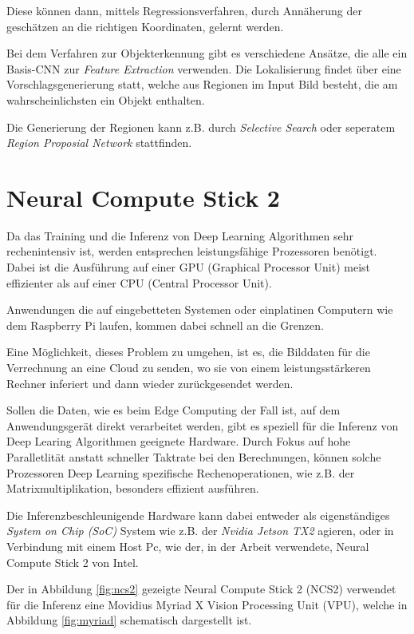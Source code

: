 Diese können dann, mittels Regressionsverfahren, 
durch Annäherung der geschätzen an die richtigen 
Koordinaten, gelernt werden.

Bei dem Verfahren zur Objekterkennung gibt es 
verschiedene Ansätze, die alle ein Basis-CNN
zur \textit{Feature Extraction} verwenden.
Die Lokalisierung findet über eine 
Vorschlagsgenerierung statt, welche aus 
Regionen im Input Bild besteht, die 
am wahrscheinlichsten ein Objekt enthalten.

Die Generierung der Regionen kann z.B. durch
\textit{Selective Search} oder
seperatem \textit{Region Proposial Network}
stattfinden.



\section{Neural Compute Stick 2}\label{ncs2}

Da das Training und die Inferenz von Deep Learning Algorithmen
sehr rechenintensiv ist, werden entsprechen leistungsfähige 
Prozessoren benötigt. Dabei ist die Ausführung auf einer GPU 
(Graphical Processor Unit) meist effizienter als auf einer 
CPU (Central Processor Unit).

Anwendungen die auf eingebetteten Systemen oder einplatinen 
Computern wie dem Raspberry Pi laufen, kommen dabei schnell
an die Grenzen.

Eine Möglichkeit, dieses Problem zu umgehen,
ist es, die Bilddaten für die 
Verrechnung an eine Cloud zu senden, wo sie 
von einem leistungsstärkeren Rechner inferiert und 
dann wieder zurückgesendet werden.

Sollen die Daten, wie es beim Edge Computing der Fall ist, 
auf dem Anwendungsgerät direkt verarbeitet werden,
gibt es speziell für die Inferenz von Deep Learing Algorithmen
geeignete Hardware.
Durch Fokus auf hohe Paralletlität anstatt schneller Taktrate
bei den Berechnungen, können solche Prozessoren
Deep Learning spezifische Rechenoperationen, 
wie z.B. der Matrixmultiplikation, besonders effizient 
ausführen.

Die Inferenzbeschleunigende Hardware kann dabei entweder
als eigenständiges \textit{System on Chip (SoC)}
System wie z.B. der \textit{Nvidia Jetson TX2} agieren, oder
in Verbindung mit einem Host Pc, wie der, in der Arbeit 
verwendete, Neural Compute Stick 2 von Intel.

Der in Abbildung \ref{fig:ncs2} gezeigte Neural Compute 
Stick 2 (NCS2) verwendet für die Inferenz eine
Movidius Myriad X Vision Processing Unit (VPU),
welche in Abbildung \ref{fig:myriad} schematisch 
dargestellt ist.

